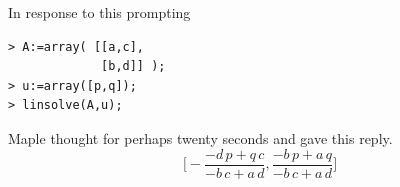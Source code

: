 \begin{exercises}
    \begin{answer}
       In response to this prompting
\begin{indented}{\small
\begin{verbatim}
> A:=array( [[a,c],
             [b,d]] );
> u:=array([p,q]);
> linsolve(A,u);
\end{verbatim}
}\end{indented}
      Maple thought for perhaps twenty seconds and gave this reply.
      \begin{equation*}
        \bigl[-\frac{-d\,p+q\,c}{-b\,c+a\,d},
          \frac{-b\,p+a\,q}{-b\,c+a\,d}\bigr]
      \end{equation*}
    \end{answer}
\end{exercises}
\endinput


